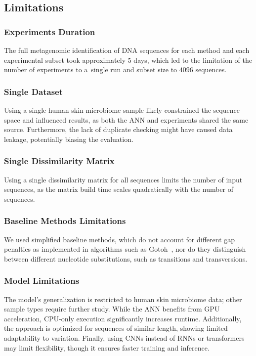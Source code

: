 \documentclass[biomedinformatics,article,submit,moreauthors]{Definitions/mdpi}
\begin{document}
        \subsection{Limitations}
            \subsubsection{Experiments Duration}
                The full metagenomic identification of DNA sequences for each method and each experimental subset took approximately 5 days, which led to the limitation of the number of experiments to a~single run and subset size to $4096$ sequences.

            \subsubsection{Single Dataset}
                Using a single human skin microbiome sample likely constrained the sequence space and influenced results, as both the ANN and experiments shared the same source. Furthermore, the lack of duplicate checking might have caused data leakage, potentially biasing the evaluation.

            \subsubsection{Single Dissimilarity Matrix}
                Using a single dissimilarity matrix for all sequences limits the number of input sequences, as the matrix build time scales quadratically with the number of sequences.

            \subsubsection{Baseline Methods Limitations}
                We used simplified baseline methods, which do not account for different gap penalties as implemented in algorithms such as Gotoh~\citep{Gotoh1982}, nor do they distinguish between different nucleotide substitutions, such as transitions and transversions.

            \subsubsection{Model Limitations}
                The model's generalization is restricted to human skin microbiome data; other sample types require further study. While the ANN benefits from GPU acceleration, CPU-only execution significantly increases runtime. Additionally, the approach is optimized for sequences of similar length, showing limited adaptability to variation. Finally, using CNNs instead of RNNs or transformers may limit flexibility, though it ensures faster training and inference.
\end{document}
